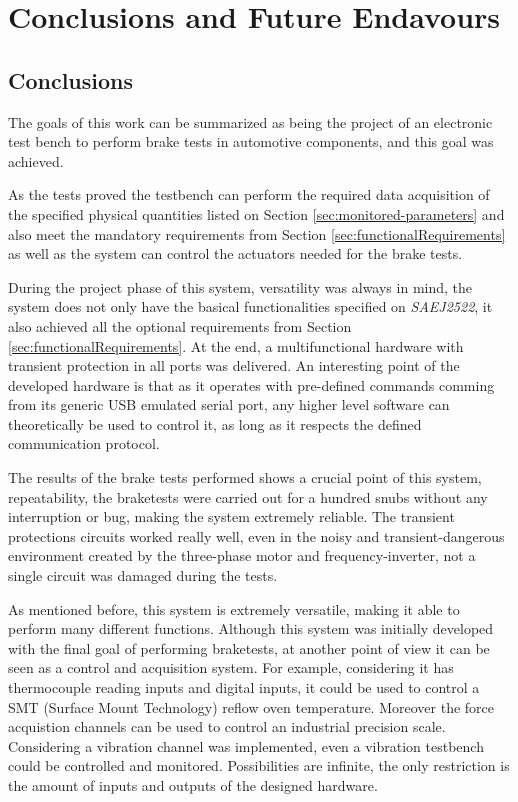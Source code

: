 \chapter{Conclusions and Future Endavours}\label{ch:conclusions-and-future-endavours}
		\section{Conclusions}\label{sec:conclusions}
The goals of this work can be summarized as being the project of an electronic test bench to perform brake tests in automotive components, and this goal was achieved.
		\par
		As the tests proved the testbench can perform the required data acquisition of the specified physical quantities listed on Section \ref{sec:monitored-parameters} and also meet the mandatory requirements from Section \ref{sec:functionalRequirements} as well as the system can control the actuators needed for the brake tests.
		\par
		During the project phase of this system, versatility was always in mind, the system does not only have the basical functionalities specified on \textit{SAEJ2522}, it also achieved all the optional requirements from Section \ref{sec:functionalRequirements}. At the end, a multifunctional hardware with transient protection in all ports was delivered. An interesting point of the developed hardware is that as it operates with pre-defined commands comming from its generic USB emulated serial port, any higher level software can theoretically be used to control it, as long as it respects the defined communication protocol.
		\par
		The results of the brake tests performed shows a crucial point of this system, repeatability, the braketests were carried out for a hundred snubs without any interruption or bug, making the system extremely reliable. The transient protections circuits worked really well, even in the noisy and transient-dangerous environment created by the three-phase motor and frequency-inverter, not a single circuit was damaged during the tests.
		\par
		As mentioned before, this system is extremely versatile, making it able to perform many different functions. Although this system was initially developed with the final goal of performing braketests, at another point of view it can be seen as a control and acquisition system. For example, considering it has thermocouple reading inputs and digital inputs, it could be used to control a SMT (Surface Mount Technology)  reflow oven temperature. Moreover the force acquistion channels can be used to control an industrial precision scale. Considering a vibration channel was implemented, even a vibration testbench could be controlled and monitored. Possibilities are infinite, the only restriction is the amount of inputs and outputs of the designed hardware.

